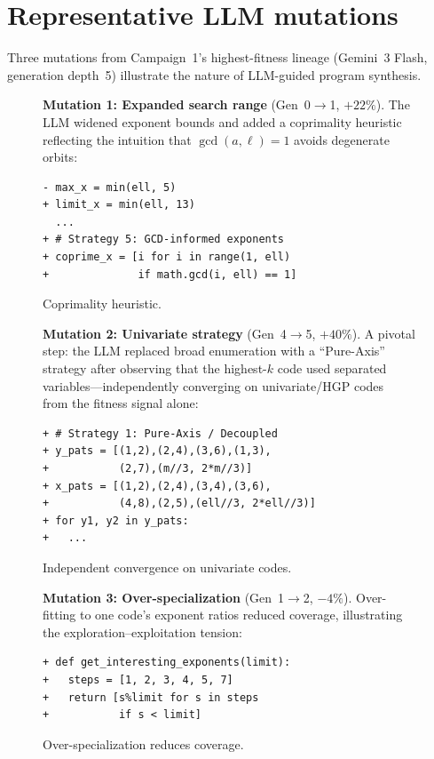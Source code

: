 \documentclass[aps,prxquantum,twocolumn,superscriptaddress,nofootinbib]{revtex4-2}
\begin{document}
\section{Representative LLM mutations}
\label{app:mutations}

Three mutations from Campaign~1's highest-fitness lineage (Gemini~3 Flash, generation depth~5) illustrate the nature of LLM-guided program synthesis. 

\begin{figure}[tbp]
\textbf{Mutation 1: Expanded search range} (Gen~0$\to$1, $+22\%$).
The LLM widened exponent bounds and added a coprimality heuristic reflecting the intuition that $\gcd(a,\ell) = 1$ avoids degenerate orbits:
\begin{lstlisting}[style=diff]
- max_x = min(ell, 5)
+ limit_x = min(ell, 13)
  ...
+ # Strategy 5: GCD-informed exponents
+ coprime_x = [i for i in range(1, ell)
+              if math.gcd(i, ell) == 1]
\end{lstlisting}
\caption{Coprimality heuristic.}
\label{fig:mut1}
\end{figure}

\begin{figure}[tbp]
\textbf{Mutation 2: Univariate strategy} (Gen~4$\to$5, $+40\%$).
A pivotal step: the LLM replaced broad enumeration with a ``Pure-Axis'' strategy after observing that the highest-$k$ code used separated variables---independently converging on univariate/HGP codes ~\cite{eberhardt2024pruning} from the fitness signal alone:
\begin{lstlisting}[style=diff]
+ # Strategy 1: Pure-Axis / Decoupled
+ y_pats = [(1,2),(2,4),(3,6),(1,3),
+           (2,7),(m//3, 2*m//3)]
+ x_pats = [(1,2),(2,4),(3,4),(3,6),
+           (4,8),(2,5),(ell//3, 2*ell//3)]
+ for y1, y2 in y_pats:
+   ...
\end{lstlisting}
\caption{Independent convergence on univariate codes.}
\label{fig:mut2}
\end{figure}

\begin{figure}[tbp]
\textbf{Mutation 3: Over-specialization} (Gen~1$\to$2, $-4\%$).
Over-fitting to one code's exponent ratios reduced coverage, illustrating the exploration--exploitation tension:
\begin{lstlisting}[style=diff]
+ def get_interesting_exponents(limit):
+   steps = [1, 2, 3, 4, 5, 7]
+   return [s%limit for s in steps
+           if s < limit]
\end{lstlisting}
\caption{Over-specialization reduces coverage.}
\label{fig:mut3}
\end{figure}
\end{document}
